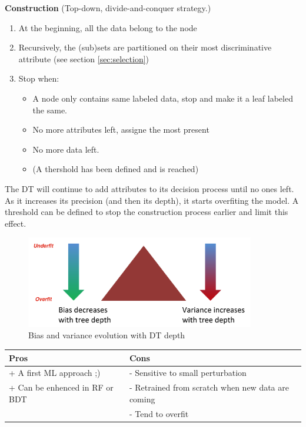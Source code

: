 \textbf{Construction} (Top-down, divide-and-conquer strategy.)
\begin{enumerate}
  \item At the beginning, all the data belong to the node
  \item Recursively, the (sub)sets are partitioned on their most discriminative attribute (see section \ref{sec:selection})
  \item Stop when:
  \begin{itemize}
  	\item A node only contains same labeled data, stop and make it a leaf labeled the same.
  	\item No more attributes left, assigne the most present
  	\item No more data left.
  	\item (A thershold has been defined and is reached)
  \end{itemize}
\end{enumerate}

The DT will continue to add attributes to its decision process until no ones left. As it increases its precision (and then its depth), it starts overfiting the model. A threshold can be defined to stop the construction process earlier and limit this effect. 

\begin{figure}[H]%
 \centering
 \includegraphics[width=10cm]{./img/07/bias_variance_DT.png}
 \caption{\label{pic:bias_variance_DT.} Bias and variance evolution with DT depth}
\end{figure}

\begin{center} %
\begin{tabular} {| l | l |}
\hline
\bf Pros & \bf Cons \\ \hline
+ A first ML approach ;) & - Sensitive to small perturbation  \\
+ Can be enhenced in RF or BDT  & - Retrained from scratch when new data are coming \\
 & - Tend to overfit \\ 
\hline
\end{tabular}
\end{center}



